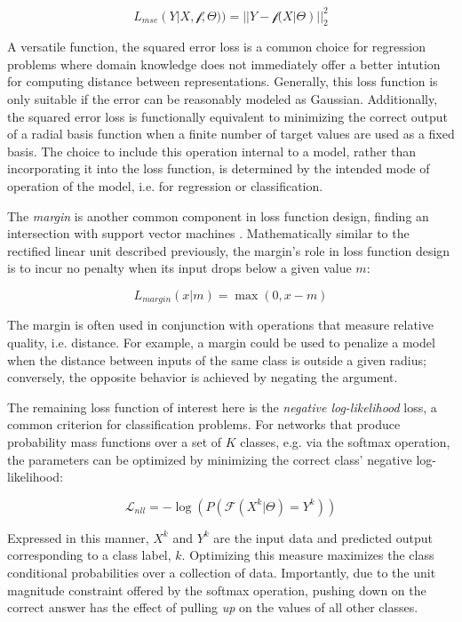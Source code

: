 \begin{equation}
\label{eq:mse}
L_{mse}(Y | X, \mathcal{f}, \Theta)) = || Y - \mathcal{f}(X | \Theta) ||_2^2
\end{equation}

\noindent A versatile function, the squared error loss is a common choice for regression problems where domain knowledge does not immediately offer a better intution for computing distance between representations.
Generally, this loss function is only suitable if the error can be reasonably modeled as Gaussian.
Additionally, the squared error loss is functionally equivalent to minimizing the correct output of a radial basis function when a finite number of target values are used as a fixed basis.
The choice to include this operation internal to a model, rather than incorporating it into the loss function, is determined by the intended mode of operation of the model, i.e. for regression or classification.

The \emph{margin} is another common component in loss function design, finding an intersection with support vector machines \cite{}.
Mathematically similar to the rectified linear unit described previously, the margin's role in loss function design is to incur no penalty when its input drops below a given value $m$:

\begin{equation}
\label{eq:mse}
L_{margin}(x | m) = \max(0, x - m)
\end{equation}

\noindent The margin is often used in conjunction with operations that measure relative quality, i.e. distance.
For example, a margin could be used to penalize a model when the distance between inputs of the same class is outside a given radius;
conversely, the opposite behavior is achieved by negating the argument.

The remaining loss function of interest here is the \emph{negative log-likelihood} loss, a common criterion for classification problems.
For networks that produce probability mass functions over a set of $K$ classes, e.g. via the softmax operation, the parameters can be optimized by minimizing the correct class' negative log-likelihood:

\begin{equation}
\label{eq:nll}
\mathcal{L}_{nll}=-\log(P(\mathcal{F}(X^k |\Theta) = Y^k))
\end{equation}

\noindent Expressed in this manner, $X^k$ and $Y^k$ are the input data and predicted output corresponding to a class label, $k$.
Optimizing this measure maximizes the class conditional probabilities over a collection of data.
Importantly, due to the unit magnitude constraint offered by the softmax operation, pushing down on the correct answer has the effect of pulling \emph{up} on the values of all other classes.

